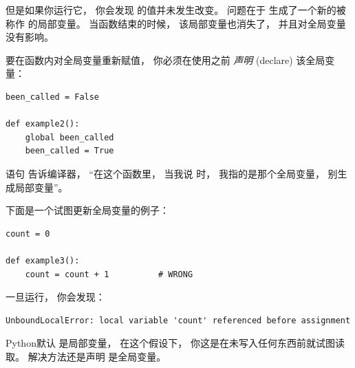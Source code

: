 但是如果你运行它， 你会发现  的值并未发生改变。
问题在于  生成了一个新的被称作  的局部变量。
当函数结束的时候， 该局部变量也消失了， 并且对全局变量没有影响。

  


要在函数内对全局变量重新赋值， 你必须在使用之前 {\em 声明} (declare) 该全局变量：

\begin{lstlisting}
been_called = False

def example2():
    global been_called
    been_called = True
\end{lstlisting}

%

 语句 告诉编译器， ``在这个函数里， 当我说  时， 我指的是那个全局变量， 别生成局部变量''。

  


下面是一个试图更新全局变量的例子：

\begin{lstlisting}
count = 0

def example3():
    count = count + 1          # WRONG
\end{lstlisting}

%

一旦运行， 你会发现：

  

\begin{lstlisting}
UnboundLocalError: local variable 'count' referenced before assignment
\end{lstlisting}

%

Python默认  是局部变量， 在这个假设下， 你这是在未写入任何东西前就试图读取。
解决方法还是声明  是全局变量。


